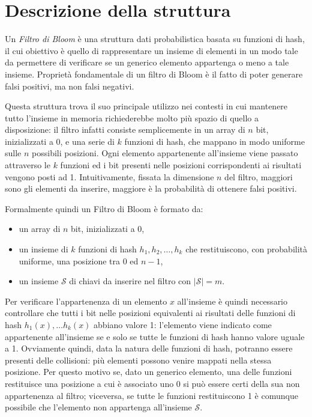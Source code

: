 \documentclass[../../main.tex]{subfiles}
\begin{document}
\section{Descrizione della struttura}

Un \textit{Filtro di Bloom} \cite{Bloom1970SpacetimeTI} è una struttura dati probabilistica basata su funzioni di hash, il cui obiettivo è quello di rappresentare un insieme di elementi in un modo tale da permettere di verificare se un generico elemento appartenga o meno a tale insieme. Proprietà fondamentale di un filtro di Bloom è il fatto di poter generare falsi positivi, ma non falsi negativi.

Questa struttura trova il suo principale utilizzo nei contesti in cui mantenere tutto l'insieme in memoria richiederebbe molto più spazio di quello a disposizione: il filtro infatti consiste semplicemente in un array di $n$ bit, inizializzati a $0$, e una serie di $k$ funzioni di hash, che mappano in modo uniforme sulle $n$ possibili posizioni. Ogni elemento appartenente all'insieme viene passato attraverso le $k$ funzioni ed i bit presenti nelle posizioni corrispondenti ai risultati vengono posti ad 1. Intuitivamente, fissata la dimensione $n$ del filtro, maggiori sono gli elementi da inserire, maggiore è la probabilità di ottenere falsi positivi.

Formalmente quindi un Filtro di Bloom è formato da:
    \begin{itemize}
        \item un array di $n$ bit, inizializzati a 0,
        \item un insieme di $k$ funzioni di hash $h_1, h_2, \dots, h_k$ che restituiscono, con probabilità uniforme, una posizione tra $0$ ed $n-1$,
        \item un insieme $\mathcal{S}$ di chiavi da inserire nel filtro con $|\mathcal{S}| = m$.
    \end{itemize}
Per verificare l'appartenenza di un elemento $x$ all'insieme è quindi necessario controllare che tutti i bit nelle posizioni equivalenti ai risultati delle funzioni di hash $h_1(x), \dots h_k(x)$ abbiano valore 1: l'elemento viene indicato come appartenente all'insieme se e solo se tutte le funzioni di hash hanno valore uguale a 1. Ovviamente quindi, data la natura delle funzioni di hash, potranno essere presenti delle collisioni: più elementi possono venire mappati nella stessa posizione. Per questo motivo se, dato un generico elemento, una delle funzioni restituisce una posizione a cui è associato uno 0 si può essere certi della sua non appartenenza al filtro; viceversa, se tutte le funzioni restituiscono 1 è comunque possibile che l'elemento non appartenga all'insieme $\mathcal{S}$.
\end{document}
